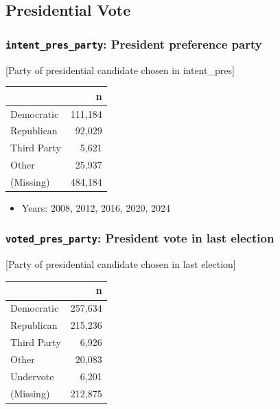 \documentclass[10pt,article,oneside]{memoir}
\begin{document}
\subsection{Presidential Vote}\label{presidential-vote}

\subsubsection{\texorpdfstring{\texttt{intent\_pres\_party}: President
preference
party}{intent\_pres\_party: President preference party}}\label{intent_pres_party-president-preference-party}

{[}Party of presidential candidate chosen in intent\_pres{]}

\begin{table}[H]
\centering
\begin{tabular}[t]{lr}
\toprule
 & n\\
\midrule
Democratic & 111,184\\
Republican & 92,029\\
Third Party & 5,621\\
Other & 25,937\\
(Missing) & 484,184\\
\bottomrule
\end{tabular}
\end{table}

\begin{itemize}
\tightlist
\item
  Years: 2008, 2012, 2016, 2020, 2024
\end{itemize}

\subsubsection{\texorpdfstring{\texttt{voted\_pres\_party}: President
vote in last
election}{voted\_pres\_party: President vote in last election}}\label{voted_pres_party-president-vote-in-last-election}

{[}Party of presidential candidate chosen in last election{]}

\begin{table}[H]
\centering
\begin{tabular}[t]{lr}
\toprule
 & n\\
\midrule
Democratic & 257,634\\
Republican & 215,236\\
Third Party & 6,926\\
Other & 20,083\\
Undervote & 6,201\\
(Missing) & 212,875\\
\bottomrule
\end{tabular}
\end{table}
\end{document}
